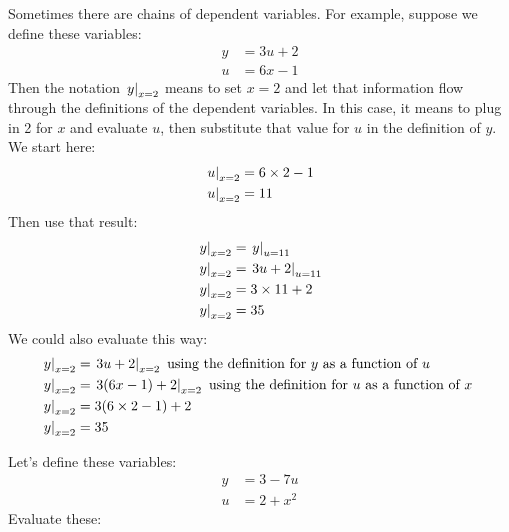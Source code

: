 Sometimes there are chains of dependent variables.
For example, suppose we define these variables:
\begin{equation*}
 \begin{split}
   y &= 3 u + 2 \\
   u &= 6 x - 1
 \end{split}
\end{equation*}
Then the notation $\left.y\right|_{x = 2}$ means to set $x = 2$ and let that information flow through the definitions of the dependent variables.
In this case, it means to plug in 2 for $x$ and evaluate $u$, then substitute that value for $u$ in the definition of $y$.
We start here:
\begin{equation*}
 \begin{split}
   \left.u\right|_{x=2} &= 6 \times 2 - 1
   \\
   \left.u\right|_{x=2} &= 11
 \end{split}
\end{equation*}
Then use that result:
\begin{equation*}
 \begin{split}
   \left.y\right|_{x=2} &= \left.y\right|_{u=11}
   \\
   \left.y\right|_{x=2} &= \left.3 u + 2\right|_{u=11}
   \\
   \left.y\right|_{x=2} &= 3 \times 11 + 2
   \\
   \left.y\right|_{x=2} &= 35
 \end{split}
\end{equation*}
We could also evaluate this way:
\begin{equation*}
 \begin{split}
   \left.y\right|_{x=2} &= \left.3 u + 2\right|_{x=2} \text{ using the definition for $y$ as a function of $u$ }
   \\
   \left.y\right|_{x=2} &= \left.3 (6x - 1) + 2\right|_{x=2} \text{ using the definition for $u$ as a function of $x$ }
   \\
   \left.y\right|_{x=2} &= 3 (6 \times 2 - 1) + 2
   \\
   \left.y\right|_{x=2} &= 35
 \end{split}
\end{equation*}

\newpage

Let's define these variables:
\begin{equation*}
 \begin{split}
   y &= 3 - 7 u \\
   u &= 2 + x^2
 \end{split}
\end{equation*}
Evaluate these:

\begin{multicols}{2}
 \begin{ProblemSet}
 \end{ProblemSet}
\end{multicols}


